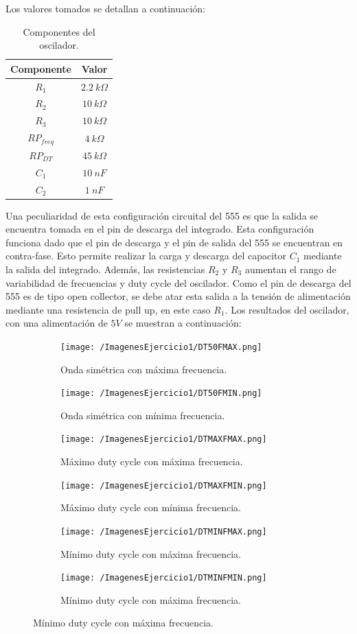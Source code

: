 Los valores tomados se detallan a continuación:

\begin{table}[H]
\centering
\begin{tabular}{cc}
\hline
Componente & Valor \\ \hline
$R_1$ & $2.2 \ k\Omega$ \\
$R_2$ & $10 \ k\Omega$ \\
$R_3$ & $10 \ k\Omega$  \\
$RP_{freq}$ & $4 \ k\Omega$  \\
$RP_{DT}$ & $45 \ k\Omega$  \\
$C_1$ & $10 \ nF$  \\
$C_2$ & $1 \ nF$\\ \hline
\end{tabular}
\caption{Componentes del oscilador.}
\end{table}

Una peculiaridad de esta configuración circuital del 555 es que la salida se encuentra tomada en el pin de descarga del integrado. Esta configuración funciona dado que el pin de descarga y el pin de salida del 555 se encuentran en contra-fase. Esto permite realizar la carga y descarga del capacitor $C_1$ mediante la salida del integrado. Además, las resistencias $R_2$ y $R_3$ aumentan el rango de variabilidad de frecuencias y duty cycle del oscilador. Como el pin de descarga del 555 es de tipo open collector, se debe atar esta salida a la tensión de alimentación mediante una resistencia de pull up, en este caso $R_1$.
Los resultados del oscilador, con una alimentación de $5V$ se muestran a continuación:

\begin{figure}
\centering
\begin{subfigure}[b]{.45\linewidth}
\texttt{[image: /ImagenesEjercicio1/DT50FMAX.png]}
\caption{Onda simétrica con máxima frecuencia.}
\end{subfigure}
\begin{subfigure}[b]{.45\linewidth}
\texttt{[image: /ImagenesEjercicio1/DT50FMIN.png]}
\caption{Onda simétrica con mínima frecuencia.}
\end{subfigure}

\begin{subfigure}[b]{.45\linewidth}
\texttt{[image: /ImagenesEjercicio1/DTMAXFMAX.png]}
\caption{Máximo duty cycle con máxima frecuencia.}
\end{subfigure}
\begin{subfigure}[b]{.45\linewidth}
\texttt{[image: /ImagenesEjercicio1/DTMAXFMIN.png]}
\caption{Máximo duty cycle con mínima frecuencia.}
\end{subfigure}

\begin{subfigure}[b]{.45\linewidth}
\texttt{[image: /ImagenesEjercicio1/DTMINFMAX.png]}
\caption{Mínimo duty cycle con máxima frecuencia.}
\end{subfigure}
\begin{subfigure}[b]{.45\linewidth}
\texttt{[image: /ImagenesEjercicio1/DTMINFMIN.png]}
\caption{Mínimo duty cycle con máxima frecuencia.}
\end{subfigure}

\end{figure}

